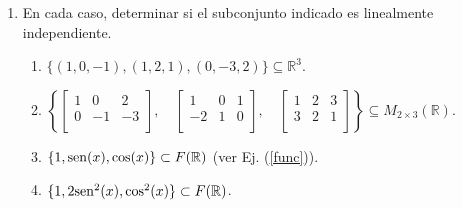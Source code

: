 \documentclass[11pt,spanish,makeidx]{amsbook}
\newcommand\R{\mathbb{R}}
\begin{document}
\begin{enumerate}
%		
%		
%		
	
	\item En cada caso, determinar si el subconjunto indicado es linealmente independiente.
	\begin{enumerate}
		\item $\{ (1,0,-1), (1,2,1), (0,-3,2) \}\subseteq \R^3$.
		\item $\left\{  \begin{bmatrix} 1 & 0 & 2 \\ 0 & -1 & -3 \\ \end{bmatrix}, \quad
		\begin{bmatrix} 1 & 0 & 1 \\ -2 & 1 & 0 \\ \end{bmatrix}, \quad
		\begin{bmatrix} 1 & 2 & 3 \\ 3 & 2 & 1 \\ \end{bmatrix} \right\}\subseteq M_{2\times 3}(\R)$.
		\item $\{1,{\rm sen}(x),\cos(x)\}  \subset F(\R)$  (ver Ej. (\ref{func})).
		\item $\{1,2{\rm sen}^2(x),\cos^2(x)\} \subset F(\R)$.
	\end{enumerate}
		

\end{enumerate}
\end{document}
